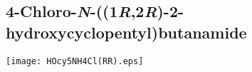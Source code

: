 %
%

%
%

\subsection{4\hyp{}Chloro\hyp{}\textit{N}\hyp{}((1\textit{R},2\textit{R})\hyp{}2\hyp{}hydroxycyclopentyl)butanamide }


\begin{scheme}[H]
	\begin{center}
		\texttt{[image: HOcy5NH4Cl(RR).eps]}
	\end{center}
\end{scheme}


